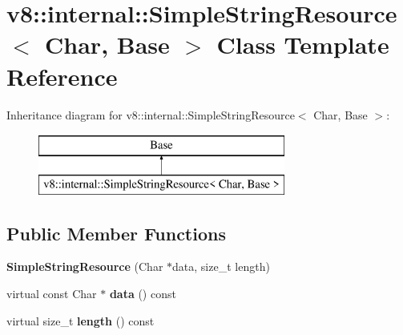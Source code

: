 \hypertarget{classv8_1_1internal_1_1_simple_string_resource}{}\section{v8\+:\+:internal\+:\+:Simple\+String\+Resource$<$ Char, Base $>$ Class Template Reference}
\label{classv8_1_1internal_1_1_simple_string_resource}
Inheritance diagram for v8\+:\+:internal\+:\+:Simple\+String\+Resource$<$ Char, Base $>$\+:\begin{figure}[H]
\begin{center}
\leavevmode
\includegraphics[height=2.000000cm]{classv8_1_1internal_1_1_simple_string_resource}
\end{center}
\end{figure}
\subsection*{Public Member Functions}
\begin{DoxyCompactItemize}
\item 
{\bfseries Simple\+String\+Resource} (Char $\ast$data, size\+\_\+t length)\hypertarget{classv8_1_1internal_1_1_simple_string_resource_a98bb052293e7c70772380bb74fcb13b6}{}\label{classv8_1_1internal_1_1_simple_string_resource_a98bb052293e7c70772380bb74fcb13b6}

\item 
virtual const Char $\ast$ {\bfseries data} () const \hypertarget{classv8_1_1internal_1_1_simple_string_resource_a2f6c35393e341e5caf45c3800f18e51e}{}\label{classv8_1_1internal_1_1_simple_string_resource_a2f6c35393e341e5caf45c3800f18e51e}

\item 
virtual size\+\_\+t {\bfseries length} () const \hypertarget{classv8_1_1internal_1_1_simple_string_resource_a398d2e478b196ad1ab0d369c6916d08b}{}\label{classv8_1_1internal_1_1_simple_string_resource_a398d2e478b196ad1ab0d369c6916d08b}

\end{DoxyCompactItemize}

